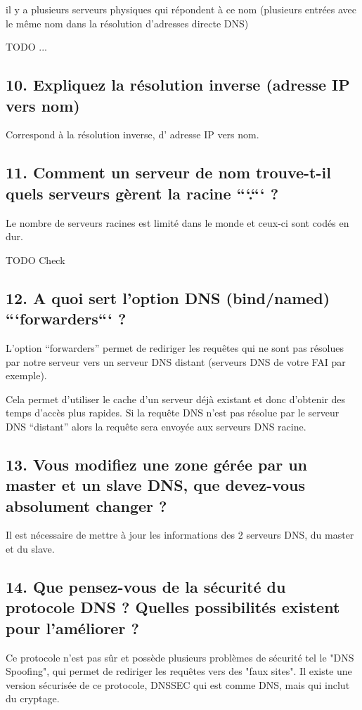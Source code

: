 \documentclass{article}
\begin{document}
il y a plusieurs serveurs physiques qui répondent à ce nom (plusieurs entrées avec le même nom dans la résolution d'adresses directe DNS)

TODO ...

\subsection*{10. Expliquez la résolution inverse (adresse IP vers nom)}
Correspond à la résolution inverse, d’ adresse IP vers nom.

\subsection*{11. Comment un serveur de nom trouve-t-il quels serveurs gèrent la racine ```.``` ?}
Le nombre de serveurs racines est limité dans le monde et ceux-ci sont codés en dur.

TODO Check

\subsection*{12. A quoi sert l’option DNS (bind/named) ```forwarders``` ?}
L'option “forwarders” permet de rediriger les requêtes qui ne sont pas résolues par notre serveur vers un serveur DNS distant (serveurs DNS de votre FAI par exemple).

Cela permet d'utiliser le cache d'un serveur déjà existant et donc d'obtenir des temps d'accès plus rapides. Si la requête DNS n'est pas résolue par le serveur DNS “distant” alors la requête sera envoyée aux serveurs DNS racine.

\subsection*{13. Vous modifiez une zone gérée par un master et un slave DNS, que devez-vous absolument changer ?}
Il est nécessaire de mettre à jour les informations des 2 serveurs DNS, du master et du slave.

\subsection*{14. Que pensez-vous de la sécurité du protocole DNS ? Quelles possibilités existent pour l’améliorer ?}
Ce protocole n'est pas sûr et possède plusieurs problèmes de sécurité tel le "DNS Spoofing", qui permet de rediriger les requêtes vers des "faux sites". Il existe une version sécurisée de ce protocole, DNSSEC qui est comme DNS, mais qui inclut du cryptage.
\end{document}

